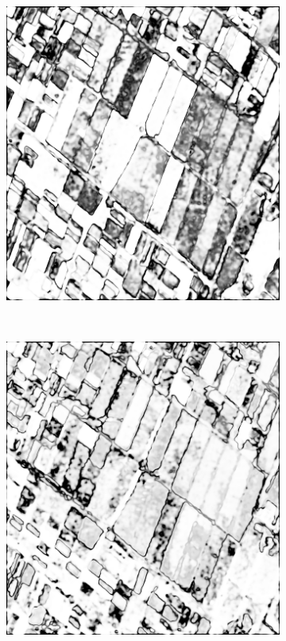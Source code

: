 \begin{figure}[tp]
\begin{subfigure}[b]{0.3\textwidth}
          	\includegraphics[width=\textwidth]{Figures/Kron/Conf/L}
          	\caption{}
          	\label{fig:Lconf}
          \end{subfigure}
          ~
        \begin{subfigure}[b]{0.3\textwidth}
            \includegraphics[width=\textwidth]{Figures/Kron/Conf/P}

\end{subfigure}
\end{figure}
